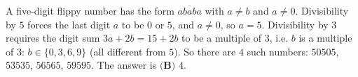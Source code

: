 A five-digit flippy number has the form $\overline{ababa}$ with $a\ne b$ and $a\ne0$. Divisibility by $5$ forces the last digit $a$ to be $0$ or $5$, and $a\ne0$, so $a=5$. Divisibility by $3$ requires the digit sum $3a+2b=15+2b$ to be a multiple of $3$, i.e. $b$ is a multiple of $3$: $b\in\{0,3,6,9\}$ (all different from $5$). So there are $4$ such numbers: $50505$, $53535$, $56565$, $59595$. The answer is $\boxed{\textbf{(B) }4}$.

